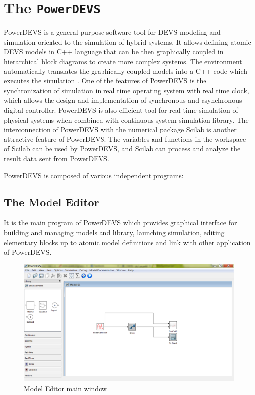 \documentclass[titlepage]{report}%
\newcommand{\pd}{\texttt{PowerDEVS}~}
\begin{document}
\section{The \pd}
PowerDEVS is a general purpose software tool for DEVS modeling and simulation oriented to the simulation of hybrid systems. It allows defining atomic DEVS models in C++ language that can be then graphically coupled in hierarchical block diagrams to create more complex systems. The environment automatically translates the graphically coupled models into a C++ code which executes the simulation \cite{BK11}.
One of the features of PowerDEVS is the synchronization of simulation in real time operating system with real time clock, which allows the design and implementation of synchronous and asynchronous digital controller. PowerDEVS is also efficient tool for real time simulation of physical systems when combined with continuous system simulation library. The interconnection of PowerDEVS with the numerical package Scilab is another attractive feature of PowerDEVS. The variables and functions in the workspace of Scilab can be used by PowerDEVS, and Scilab can process and analyze the result data sent from PowerDEVS.

PowerDEVS is composed of various independent programs: 

\subsection{The Model Editor} 
It is the main program of PowerDEVS which provides graphical interface for building and managing models and library, launching simulation, editing elementary blocks up to atomic model definitions and link with other application of PowerDEVS. 
 
 
 \begin{figure}[ht!]
  \centering
    \includegraphics[width=1\textwidth]{Fig2.png}
    \caption{Model Editor main window}
    \label{model_edt}
\end{figure}
 
\end{document}
